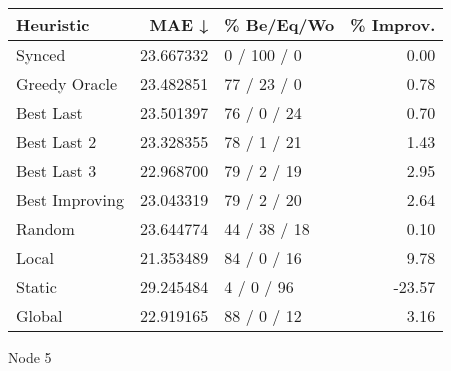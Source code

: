 \begin{tabular}{lrlr}
\toprule
      Heuristic &      MAE ↓ &    \% Be/Eq/Wo & \% Improv. \\
\midrule
         Synced &  23.667332 &   0 / 100 / 0 &      0.00 \\
  Greedy Oracle &  23.482851 &   77 / 23 / 0 &      0.78 \\
      Best Last &  23.501397 &   76 / 0 / 24 &      0.70 \\
    Best Last 2 &  23.328355 &   78 / 1 / 21 &      1.43 \\
    Best Last 3 &  22.968700 &   79 / 2 / 19 &      2.95 \\
 Best Improving &  23.043319 &   79 / 2 / 20 &      2.64 \\
         Random &  23.644774 &  44 / 38 / 18 &      0.10 \\
          Local &  21.353489 &   84 / 0 / 16 &      9.78 \\
         Static &  29.245484 &    4 / 0 / 96 &    -23.57 \\
         Global &  22.919165 &   88 / 0 / 12 &      3.16 \\
\bottomrule
\end{tabular}
\caption{Node 5}
\label{tab:non_lr001_le1_bs2_5}
